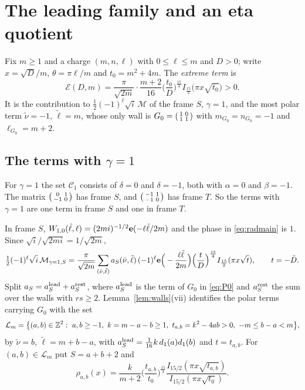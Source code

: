 \section{The leading family and an eta quotient}\label{sec:model}

Fix $m\ge1$ and a charge $(m,n,\ell)$ with $0\le\ell\le m$ and $D>0$; write $x=\sqrt D/m$, $\theta=\pi\ell/m$ and $t_0=m^2+4m$. The \emph{extreme term} is
\begin{equation}\label{eq:ext}
\mathcal E(D,m)=\frac{\pi}{\sqrt{2m}}\cdot\frac{m+2}{16}\Big(\frac{t_0}D\Big)^{\frac{15}4}I_{\frac{15}2}\big(\pi x\sqrt{t_0}\big)>0 .
\end{equation}
It is the contribution to $\frac12(-1)^\ell\sqrt i\,\mathcal M$ of the frame $S$, $\gamma=1$, and the most polar term $\tilde\nu=-1$, $\tilde\ell=m$, whose only wall is $G_0=\begin{psmallmatrix}1&0\\1&1\end{psmallmatrix}$ with $m_{G_0}=n_{G_0}=-1$ and $\ell_{G_0}=m+2$.

\subsection{The terms with \texorpdfstring{$\gamma=1$}{gamma=1}}
For $\gamma=1$ the set $\mathcal C_1$ consists of $\delta=0$ and $\delta=-1$, both with $\alpha=0$ and $\beta=-1$. The matrix $\begin{psmallmatrix}0&1\\-1&0\end{psmallmatrix}$ has frame $S$, and $\begin{psmallmatrix}-1&1\\-1&0\end{psmallmatrix}$ has frame $T$. So the terms with $\gamma=1$ are one term in frame $S$ and one in frame $T$.

In frame $S$, $W_{1,0}(\tilde\ell,\ell)=(2mi)^{-1/2}\mathbf e(-\ell\tilde\ell/2m)$ and the phase in \eqref{eq:radmain} is $1$. Since $\sqrt i/\sqrt{2mi}=1/\sqrt{2m}$,
\begin{equation}\label{eq:gamma1S}
\tfrac12(-1)^\ell\sqrt i\,\mathcal M_{\gamma=1,S}=\frac{\pi}{\sqrt{2m}}\sum_{(\tilde\nu,\tilde\ell)}a_S(\tilde\nu,\tilde\ell)\,(-1)^\ell\mathbf e\Big(-\frac{\ell\tilde\ell}{2m}\Big)\Big(\frac tD\Big)^{\frac{15}4}I_{\frac{15}2}(\pi x\sqrt t),\qquad t=-\tilde D .
\end{equation}
Split $a_S=a_S^{\rm lead}+a_S^{\rm rest}$, where $a_S^{\rm lead}$ is the term of $G_0$ in \eqref{eq:P0} and $a_S^{\rm rest}$ the sum over the walls with $rs\ge2$. Lemma~\ref{lem:walls}(vii) identifies the polar terms carrying $G_0$ with the set
\[
\mathcal L_m=\big\{(a,b)\in\ZZ^2:\ a,b\ge-1,\ k=m-a-b\ge1,\ t_{a,b}=k^2-4ab>0,\ -m\le b-a<m\big\},
\]
by $\tilde\nu=b$, $\tilde\ell=m+b-a$, with $a_S^{\rm lead}=\frac1{16}k\,d_1(a)d_1(b)$ and $t=t_{a,b}$. For $(a,b)\in\mathcal L_m$ put $S=a+b+2$ and
\begin{equation}\label{eq:rho}
\rho_{a,b}(x)=\frac{k}{m+2}\Big(\frac{t_{a,b}}{t_0}\Big)^{\frac{15}4}\frac{I_{15/2}(\pi x\sqrt{t_{a,b}})}{I_{15/2}(\pi x\sqrt{t_0})}.
\end{equation}

